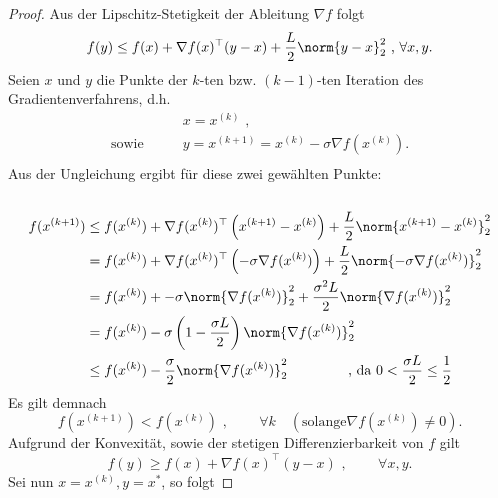 \begin{proof}
  Aus der Lipschitz-Stetigkeit der Ableitung $\nabla f$ folgt
  \begin{equation*}
      f(y) \leq f(x) + \nabla f(x)^\top (y-x) + \frac{L}{2} \norm{y-x}^2_2 \text{ , } \forall x,y \text{.}
  \end{equation*}
  Seien $x$ und $y$ die Punkte der $k$-ten bzw. $(k-1)$-ten Iteration des Gradientenverfahrens, d.h.
  \begin{align*}
     & x = x^{(k)} \text{ ,}\\
    \text{sowie} \qquad & y = x^{(k+1)} = x^{(k)} - \sigma \nabla f(x^{(k)}) \text{.}\\
  \end{align*}
  Aus der Ungleichung ergibt für diese zwei gewählten Punkte:\\\\
    \begin{gather*}
      			\begin{aligned}
              f(x^{(k+1)}) & \leq f(x^{(k)}) + \nabla f(x^{(k)})^\top \left(x^{(k+1)}-x^{(k)}\right) + \frac{L}{2} \norm{x^{(k+1)}-x^{(k)}}^2_2 \\
              & =f(x^{(k)}) + \nabla f(x^{(k)})^\top \left(-\sigma \nabla f(x^{(k)})\right) + \frac{L}{2} \norm{-\sigma \nabla f(x^{(k)})}^2_2 \\
              & = f(x^{(k)}) + -\sigma \norm{\nabla f(x^{(k)})}^2_2 + \frac{\sigma ^2 L}{2} \norm{\nabla f(x^{(k)})}^2_2 \\
              & = f(x^{(k)}) - \sigma \left(1 - \frac{\sigma L}{2}\right)\norm{\nabla f(x^{(k)})}^2_2 \\
              & \leq f(x^{(k)}) - \frac{\sigma}{2} \norm{\nabla f(x^{(k)})}^2_2 \qquad \qquad \text{  ,   da } 0 < \frac{\sigma L}{2} \leq \frac{1}{2} \\
      			\end{aligned}
    	\end{gather*}
      Es gilt demnach
      \begin{equation*}
        f(x^{(k+1)}) < f(x^{(k)}) \text{ , } \qquad \forall k \quad (\text{solange} \nabla f(x^{(k)}) \neq 0)\text{.}
      \end{equation*}
      Aufgrund der Konvexität, sowie der stetigen Differenzierbarkeit von $f$ gilt
      \begin{equation*}
        f(y) \geq f(x) + \nabla f(x)^\top (y-x) \text{ , }\qquad \forall x,y \text{.}
      \end{equation*}
      Sei nun $x=x^{(k)}, y=x^\ast$, so folgt

\end{proof}
